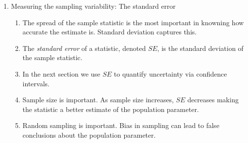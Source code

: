 \documentclass{article}
\begin{document}
\begin{enumerate}
\item Measuring the sampling variability: The standard error
\begin{enumerate}
\item The spread of the sample statistic is the most important in knowning how accurate the estimate is. Standard deviation captures this.
\item The \emph{standard error} of a statistic, denoted $SE$, is the standard deviation of the sample statistic.
\item In the next section we use $SE$ to quantify uncertainty via confidence intervals.
\item Sample size is important. As sample size increases, $SE$ decreases making the statistic a better estimate of the population parameter.
\item Random sampling is important. Bias in sampling can lead to false conclusions about the population parameter.
\end{enumerate}

\end{enumerate}

\end{document}
